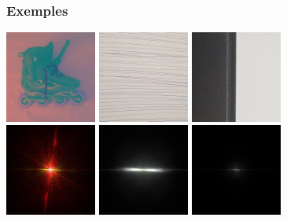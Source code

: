 \documentclass[french]{beamer}
\begin{document}
\begin{frame}
	\frametitle{Exemples}
	\includegraphics[width=3cm]{images/roller_lab.jpg} \includegraphics[width=3cm]{images/test1.png} \includegraphics[width=3cm]{images/test2.png} \\ 
	\includegraphics[width=3cm]{images/roller_fft.jpg} \includegraphics[width=3cm]{images/test1_fft.jpg} \includegraphics[width=3cm]{images/test2_fft.jpg}	
\end{frame}
\end{document}

